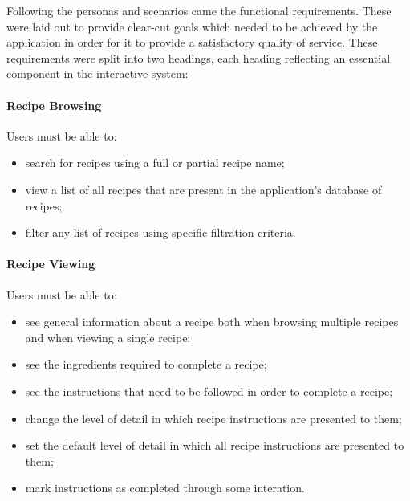 




Following the personas and scenarios came the functional requirements. These were laid out to provide clear-cut goals which needed to be achieved by the application in order for it to provide a satisfactory quality of service. These requirements were split into two headings, each heading reflecting an essential component in the interactive system:

\paragraph{Recipe Browsing}
Users must be able to:
\begin{itemize}
\item search for recipes using a full or partial recipe name;
\item view a list of all recipes that are present in the application's database of recipes;
\item filter any list of recipes using specific filtration criteria.
\end{itemize}

\paragraph{Recipe Viewing}
Users must be able to:
\begin{itemize}
\item see general information about a recipe both when browsing multiple recipes and when viewing a single recipe;
\item see the ingredients required to complete a recipe;
\item see the instructions that need to be followed in order to complete a recipe;
\item change the level of detail in which recipe instructions are presented to them;
\item set the default level of detail in which all recipe instructions are presented to them;
\item mark instructions as completed through some interation.
\end{itemize}

